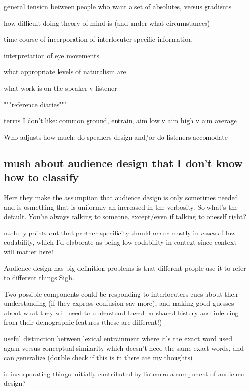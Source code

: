 \documentclass[]{article}
\begin{document}
general tension between people who want a set of absolutes, versus gradients

how difficult doing theory of mind is (and under what circumstances)

time course of incorporation of interlocuter specific information 

interpretation of eye movements

what appropriate levels of naturalism are

what work is on the speaker v listener

"""reference diaries"""

terms I don't like: common ground, entrain, aim low v aim high v aim average

Who adjusts how much: do speakers design and/or do listeners accomodate




\subsection{mush about audience design that I don't know how to classify}

\cite{horton2002a} Here they make the assumption that audience design is only sometimes needed and is osmething that is uniformly an increased in the verbosity. So what's the default. You're always talking to someone, except/even if talking to oneself right? 

\cite{horton2002a} usefully points out that partner specificity should occur mostly in cases of low codability, which I'd elaborate as being low codability in context since context will matter here!

Audience design has big definition problems is that different people use it to refer to different things Sigh. 

Two possible components could be  responding to interlocuters cues about their understanding (if they express confusion say more), and making good guesses about what they will need to understand based on shared history and inferring from their demographic features (these are different!) 

\cite{horton2002a} useful distinction between lexical entrainment where it's the exact word used again versus conceptual similarity which doesn't need the same exact words, and can generalize (double check if this is in there are my thoughts) 

is incorporating things initially contributed by listeners a component of audience design? 
\end{document}
